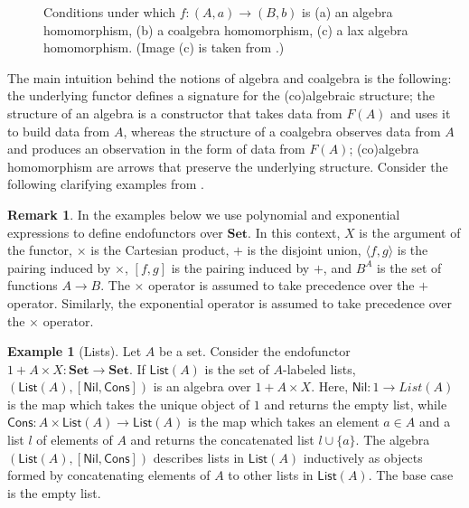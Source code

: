 \documentclass[11pt,a4paper,openright,twoside]{report}
\newcounter{mycounter}
\theoremstyle{plain}
\theoremstyle{definition}
\newtheorem{remark}[mycounter]{Remark}
\newtheorem{example}[mycounter]{Example}
\begin{document}
\begin{figure}[h]
\begin{center}
\begin{subfigure}{0.25\textwidth}
      \caption{}
    \end{subfigure}            
    \caption[(Co)algebra homomorphisms]{Conditions under which $f:(A,a)\to(B,b)$ is (a) an algebra homomorphism, (b) a coalgebra homomorphism, (c) a lax algebra homomorphism. (Image (c) is taken from \cite{gavranovicposition}.)}
    \label{fig: alghom}
  \end{center}
\end{figure}

The main intuition behind the notions of algebra and coalgebra is the following: the underlying functor defines a signature for the (co)algebraic structure; the structure of an algebra is a constructor that takes data from $F(A)$ and uses it to build data from $A$, whereas the structure of a coalgebra observes data from $A$ and produces an observation in the form of data from $F(A)$; (co)algebra homomorphism are arrows that preserve the underlying structure. Consider the following clarifying examples from \cite{gavranovicposition}.

\begin{remark}
  In the examples below we use polynomial and exponential expressions to define endofunctors over $\mathbf{Set}$. In this context, $X$ is the argument of the functor, $\times$ is the Cartesian product, $+$ is the disjoint union, $\langle f,g \rangle$ is the pairing induced by $\times$, $[f,g]$ is the pairing induced by $+$, and $B^A$ is the set of functions $A \to B$. The $\times$ operator is assumed to take precedence over the $+$ operator. Similarly, the exponential operator is assumed to take precedence over the $\times$ operator. 
\end{remark}

\begin{example}[Lists]
  \label{ex: lists}
  Let $A$ be a set. Consider the endofunctor $1 + A \times X: \mathbf{Set} \to \mathbf{Set}$. If $\mathsf{List}(A)$ is the set of $A$-labeled lists, $(\mathsf{List}(A), [\mathsf{Nil}, \mathsf{Cons}])$ is an algebra over $1 + A \times X$. Here, $\mathsf{Nil}: 1 \to {List}(A)$ is the map which takes the unique object of $1$ and returns the empty list, while $\mathsf{Cons}: A \times \mathsf{List}(A) \to \mathsf{List}(A)$ is the map which takes an element $a \in A$ and a list $l$ of elements of $A$ and returns the concatenated list $l \cup \{a\}$. The algebra $(\mathsf{List}(A), [\mathsf{Nil}, \mathsf{Cons}])$ describes lists in $\mathsf{List}(A)$ inductively as objects formed by concatenating elements of $A$ to other lists in $\mathsf{List}(A)$. The base case is the empty list.
\end{example}
\end{document}
